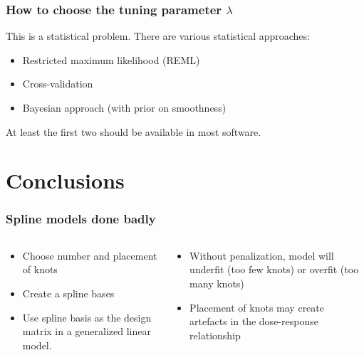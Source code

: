 \documentclass{beamer}
\begin{document}
\begin{frame}
  \frametitle{How to choose the tuning parameter $\lambda$}

  This is a statistical problem. There are various statistical
  approaches:
  \begin{itemize}
  \item Restricted maximum likelihood (REML)
  \item Cross-validation
  \item Bayesian approach (with prior on smoothness)
  \end{itemize}
  At least the first two should be available in most software.
  
\end{frame}

\section{Conclusions}

\begin{frame}
  \frametitle{Spline models done badly}

  \begin{columns}
    \begin{column}{5cm}
      \begin{itemize}
      \item Choose number and placement of knots
      \item Create a spline bases
      \item Use spline basis as the design matrix in a generalized linear model.
      \end{itemize}
    \end{column}
    \begin{column}{5cm}
      \begin{itemize}
      \item Without penalization, model will underfit (too few knots)
        or overfit (too many knots)
      \item Placement of knots may create artefacts in the dose-response
        relationship
      \end{itemize}
    \end{column}
  \end{columns}

\end{frame}
\end{document}

